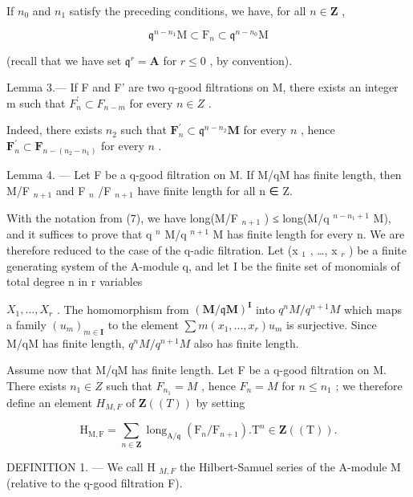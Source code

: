 If \(n_{0}\) and \(n_{1}\) satisfy the preceding conditions, we have, for all \(n\in\mathbf{Z}\) ,

\[
\mathfrak {q} ^ {n - n _ {1}} \mathrm{M} \subset \mathrm{F} _ {n} \subset \mathfrak {q} ^ {n - n _ {0}} \mathrm{M}\tag{7}
\]

(recall that we have set \(\mathfrak{q}^r = \mathbf{A}\) for \(r\leqslant 0\) , by convention).

Lemma 3.--- If F and F' are two q-good filtrations on M, there exists an integer m such that \(F_{n}^{\prime} \subset F_{n-m}\) for every \(n \in Z\) .

Indeed, there exists \(n_{2}\) such that \(\mathbf{F}_{n}^{\prime}\subset\mathfrak{q}^{n-n_{2}}\mathbf{M}\) for every \(n\) , hence \(\mathbf{F}_{n}^{\prime}\subset\mathbf{F}_{n-(n_{2}-n_{1})}\) for every \(n\) .

Lemma 4. --- Let F be a q-good filtration on M. If M/qM has finite length, then M/F \(_{n+1}\) and F \(_{n}\) /F \(_{n+1}\) have finite length for all n ∈ Z.

With the notation from (7), we have long(M/F \(_{n+1}\) ) ≤ long(M/q \(^{n-n_1+1}\) M), and it suffices to prove that q \(^{n}\) M/q \(^{n+1}\) M has finite length for every n. We are therefore reduced to the case of the q-adic filtration. Let (x \(_{1}\) , \ldots, x \(_{r}\) ) be a finite generating system of the A-module q, and let I be the finite set of monomials of total degree n in r variables

\(X_{1},...,X_{r}\) . The homomorphism from \((\mathbf{M}/\mathfrak{q}\mathbf{M})^{\mathbf{I}}\) into \(q^{n}M/q^{n+1}M\) which maps a family \((u_{m})_{m\in\mathbf{I}}\) to the element \(\sum m(x_{1},...,x_{r})u_{m}\) is surjective. Since M/qM has finite length, \(q^{n}M/q^{n+1}M\) also has finite length.

Assume now that M/qM has finite length. Let F be a q-good filtration on M. There exists \(n_{1} \in Z\) such that \(F_{n_{1}} = M\) , hence \(F_{n} = M\) for \(n \leqslant n_{1}\) ; we therefore define an element \(H_{M,F}\) of \(\mathbf{Z}((T))\) by setting

\[
\mathrm{H} _ {\mathrm{M}, \mathrm{F}} = \sum_ {n \in \mathbf {Z}} \operatorname{long} _ {\mathrm{A} / \mathfrak {q}} (\mathrm{F} _ {n} / \mathrm{F} _ {n + 1}). \mathrm{T} ^ {n} \in \mathbf {Z} ((\mathrm{T})) .\tag{8}
\]

DEFINITION 1. --- We call H \(_{M,F}\) the Hilbert-Samuel series of the A-module M (relative to the q-good filtration F).

